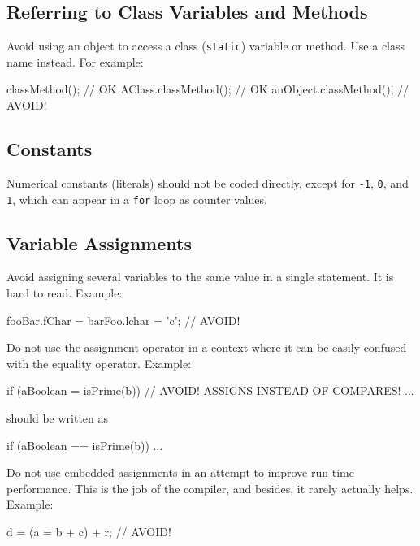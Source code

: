 \documentclass{article}
\begin{document}
\subsection{Referring to Class Variables and Methods}

Avoid using an object to access a class (\texttt{static}) variable or method. Use a class name
instead. For example:

\begin{snippet}
classMethod();           // OK
AClass.classMethod();    // OK
anObject.classMethod();  // AVOID!
\end{snippet}

\subsection{Constants}

Numerical constants (literals) should not be coded directly, except for \texttt{-1}, \texttt{0},
and \texttt{1}, which can appear in a \texttt{for} loop as counter values.

\subsection{Variable Assignments}

Avoid assigning several variables to the same value in a single statement. It is hard to read.
Example:

\begin{snippet}
fooBar.fChar = barFoo.lchar = 'c'; // AVOID!
\end{snippet}

Do not use the assignment operator in a context where it can be easily confused with the equality
operator. Example:

\begin{snippet}
if (aBoolean = isPrime(b)) {  // AVOID! ASSIGNS INSTEAD OF COMPARES!
    ...
}
\end{snippet}

should be written as

\begin{snippet}
if (aBoolean == isPrime(b)) {
    ...
}
\end{snippet}

Do not use embedded assignments in an attempt to improve run-time performance. This is the
job of the compiler, and besides, it rarely actually helps. Example:

\begin{snippet}
d = (a = b + c) + r;  // AVOID!
\end{snippet}
\end{document}
